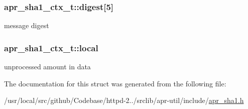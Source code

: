 \subsubsection[{\texorpdfstring{digest}{digest}}]{ apr\+\_\+sha1\+\_\+ctx\+\_\+t\+::digest\mbox{[}5\mbox{]}}\hypertarget{structapr__sha1__ctx__t_a152a127b59eb6e1cb686c2bbe00d51de}{}\label{structapr__sha1__ctx__t_a152a127b59eb6e1cb686c2bbe00d51de}
message digest 
\subsubsection[{\texorpdfstring{local}{local}}]{ apr\+\_\+sha1\+\_\+ctx\+\_\+t\+::local}\hypertarget{structapr__sha1__ctx__t_aaa8433058ac7a3b0649821cbab7de822}{}\label{structapr__sha1__ctx__t_aaa8433058ac7a3b0649821cbab7de822}
unprocessed amount in data 

The documentation for this struct was generated from the following file\+:\begin{DoxyCompactItemize}
\item 
/usr/local/src/github/\+Codebase/httpd-\/2../srclib/apr-\/util/include/\hyperlink{apr__sha1_8h}{apr\+\_\+sha1.\+h}\end{DoxyCompactItemize}
